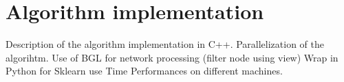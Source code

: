 \documentclass{standalone}
\begin{document}
\section[DNetPRO Implementation]{Algorithm implementation}\label{implementation}

Description of the algorithm implementation in C++.
Parallelization of the algorihtm.
Use of BGL for network processing (filter node using view)
Wrap in Python for Sklearn use
Time Performances on different machines.
\end{document}
